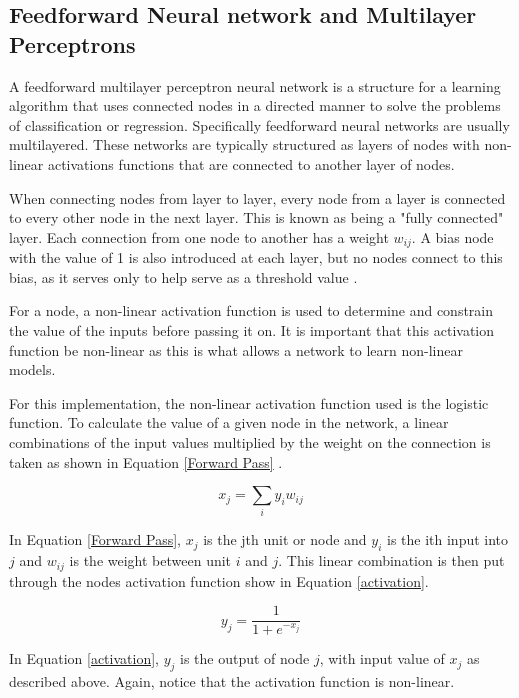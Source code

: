 \documentclass[jair, twoside,11pt,theapa]{article}
\begin{document}
\subsection{Feedforward Neural network and Multilayer Perceptrons}
A feedforward multilayer perceptron neural network is a structure for a learning algorithm that uses connected nodes in a directed manner to solve the problems of classification or regression. 
Specifically feedforward neural networks are usually multilayered. 
These networks are typically structured as layers of nodes with non-linear activations functions that are connected to another layer of nodes. 

When connecting nodes from layer to layer, every node from a layer is connected to every other node in the next layer.
This is known as being a "fully connected" layer.  
Each connection from one node to another has a weight $w_{ij}$. 
A bias node with the value of 1 is also introduced at each layer, but no nodes connect to this bias, as it serves only to help serve as a threshold value \cite{BackProp}.


For a node, a non-linear activation function is used to determine and constrain the value of the inputs before passing it on. 
It is important that this activation function be non-linear as this is what allows a network to learn non-linear models. 

For this implementation, the non-linear activation function used is the logistic function.
To calculate the value of a given node in the network, a linear combinations of the input values multiplied by the weight on the connection is taken as shown in Equation \ref{Forward Pass} \cite{BackProp}.

\begin{equation}
\label{Forward Pass}
x_j = \sum_{i}{y_i w_{ij}}
\end{equation}

In Equation \ref{Forward Pass}, $x_j$ is the jth unit or node and $y_i$ is the ith input into $j$ and $w_{ij}$ is the weight between unit $i$ and $j$. 
This linear combination is then put through the nodes activation function \cite{BackProp} show in Equation \ref{activation}.

\begin{equation}
\label{activation}
y_j = \frac{1}{1+e^{-x_j}}
\end{equation}


In Equation \ref{activation}, $y_j$ is the output of node $j$, with input value of $x_j$ as described above. Again, notice that the activation function is non-linear.
\end{document}
